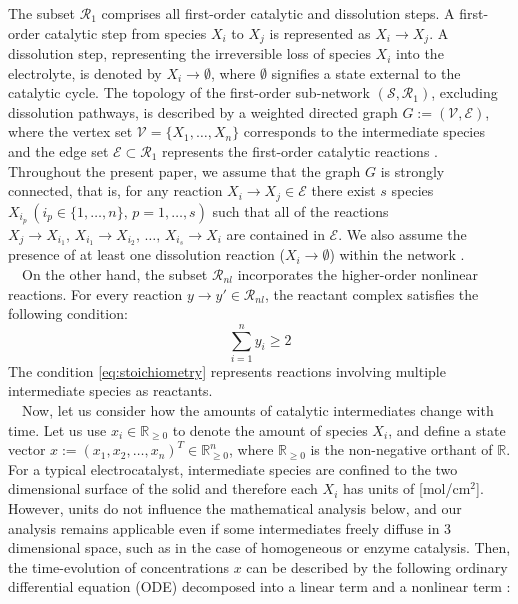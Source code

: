 \documentclass[11pt,a4paper]{article}
\begin{document}
The subset $\mathcal{R}_1$ comprises all first-order catalytic and dissolution steps. A first-order catalytic step from species $X_i$ to $X_j$ is represented as $X_i \to X_j$. A dissolution step, representing the irreversible loss of species $X_i$ into the electrolyte, is denoted by $X_i \to \emptyset$, where $\emptyset$ signifies a state external to the catalytic cycle. The topology of the first-order sub-network $(\mathcal{S}, \mathcal{R}_1)$, excluding dissolution pathways, is described by a weighted directed graph $G := (\mathcal{V}, \mathcal{E})$, where the vertex set $\mathcal{V} = \{X_1, \dots, X_n\}$ corresponds to the intermediate species and the edge set $\mathcal{E} \subset \mathcal{R}_1$ represents the first-order catalytic reactions \cite{Ooka2024JPCL,Komatsu-Ooka}. Throughout the present paper, we assume that the graph $G$ is strongly connected, that is, for any reaction $X_i \to X_j \in \mathcal{E}$ there exist $s$ species $X_{i_p}\,(i_p\in \{1,\ldots,n\},\,p=1,\ldots,s)$ such that all of the reactions $X_j \to X_{i_1},\,X_{i_1} \to X_{i_2},\,\ldots,\,X_{i_s} \to X_i$ are contained in $\mathcal{E}$. We also assume the presence of at least one dissolution reaction ($X_i \to \emptyset$) within the network \cite{Ooka2024JPCL,Komatsu-Ooka}.\\
~~On the other hand, the subset $\mathcal{R}_{nl}$ incorporates the higher-order nonlinear reactions. For every reaction $y \to y' \in \mathcal{R}_{nl}$, the reactant complex satisfies the following condition:
\begin{equation}
\sum_{i=1}^n y_i \ge 2 \label{eq:stoichiometry}
\end{equation}
The condition \eqref{eq:stoichiometry} represents reactions involving multiple intermediate species as reactants.\\
~~Now, let us consider how the amounts of catalytic intermediates change with time. Let us use $x_i \in {\mathbb R}_{\geq 0}$ to denote the amount of species $X_i$, and define a state vector  $x:=(x_1,x_2,\ldots,x_n)^T \in {\mathbb R}_{\geq 0}^n$, where ${\mathbb R}_{\geq 0}$ is the non-negative orthant of ${\mathbb R}$. For a typical electrocatalyst, intermediate species are confined to the two dimensional surface of the solid and therefore each $X_i$ has units of [mol/cm$^2$]. However, units do not influence the mathematical analysis below, and our analysis remains applicable even if some intermediates freely diffuse in 3 dimensional space, such as in the case of homogeneous or enzyme catalysis. Then, the time-evolution of concentrations $x$ can be described by the following ordinary differential equation (ODE) decomposed into a linear term and a nonlinear term \cite{Feinberg}:
\end{document}
